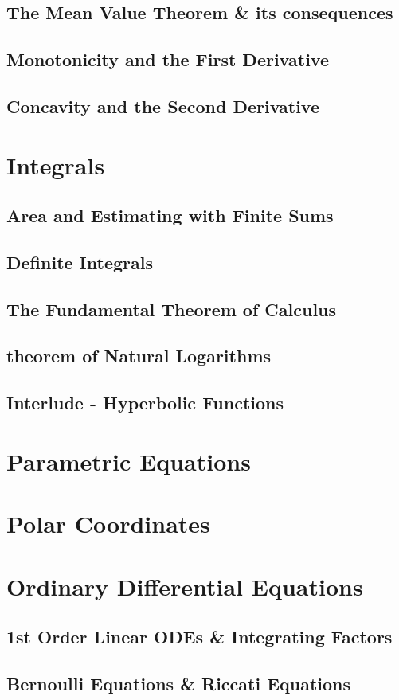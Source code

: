 \documentclass{article}
\begin{document}
\subsection{The Mean Value Theorem \& its consequences}
\subsection{Monotonicity and the First Derivative}
\subsection{Concavity and the Second Derivative}
\section{Integrals}
\subsection{Area and Estimating with Finite Sums}
\subsection{Definite Integrals}
\subsection{The Fundamental Theorem of Calculus}
\subsection{theorem of Natural Logarithms}
\subsection{Interlude - Hyperbolic Functions}
\section{Parametric Equations}
\section{Polar Coordinates}
\section{Ordinary Differential Equations}
\subsection{1st Order Linear ODEs \& Integrating Factors}
\subsection{Bernoulli Equations \& Riccati Equations}
\end{document}
